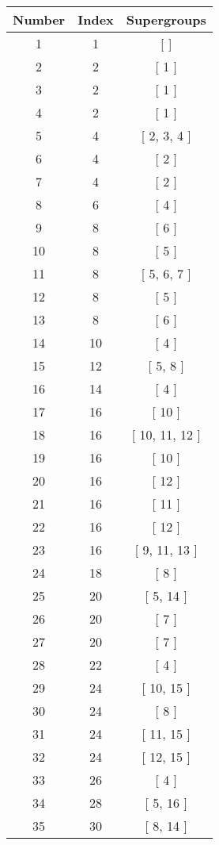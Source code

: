 \begin{center}
\begin{longtable}[H]{|| c c c ||}
\hline
Number & Index & Supergroups \\ 
\hline
1 & 1 & [  ] \\ 
\hline
2 & 2 & [ 1 ] \\ 
\hline
3 & 2 & [ 1 ] \\ 
\hline
4 & 2 & [ 1 ] \\ 
\hline
5 & 4 & [ 2, 3, 4 ] \\ 
\hline
6 & 4 & [ 2 ] \\ 
\hline
7 & 4 & [ 2 ] \\ 
\hline
8 & 6 & [ 4 ] \\ 
\hline
9 & 8 & [ 6 ] \\ 
\hline
10 & 8 & [ 5 ] \\ 
\hline
11 & 8 & [ 5, 6, 7 ] \\ 
\hline
12 & 8 & [ 5 ] \\ 
\hline
13 & 8 & [ 6 ] \\ 
\hline
14 & 10 & [ 4 ] \\ 
\hline
15 & 12 & [ 5, 8 ] \\ 
\hline
16 & 14 & [ 4 ] \\ 
\hline
17 & 16 & [ 10 ] \\ 
\hline
18 & 16 & [ 10, 11, 12 ] \\ 
\hline
19 & 16 & [ 10 ] \\ 
\hline
20 & 16 & [ 12 ] \\ 
\hline
21 & 16 & [ 11 ] \\ 
\hline
22 & 16 & [ 12 ] \\ 
\hline
23 & 16 & [ 9, 11, 13 ] \\ 
\hline
24 & 18 & [ 8 ] \\ 
\hline
25 & 20 & [ 5, 14 ] \\ 
\hline
26 & 20 & [ 7 ] \\ 
\hline
27 & 20 & [ 7 ] \\ 
\hline
28 & 22 & [ 4 ] \\ 
\hline
29 & 24 & [ 10, 15 ] \\ 
\hline
30 & 24 & [ 8 ] \\ 
\hline
31 & 24 & [ 11, 15 ] \\ 
\hline
32 & 24 & [ 12, 15 ] \\ 
\hline
33 & 26 & [ 4 ] \\ 
\hline
34 & 28 & [ 5, 16 ] \\ 
\hline
35 & 30 & [ 8, 14 ] \\ 
\hline

\end{longtable}
\end{center}
